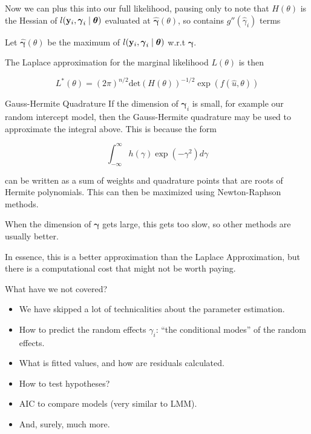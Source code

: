 \documentclass[
  ignorenonframetext,
]{beamer}
\providecommand{\tightlist}{%
  \setlength{\itemsep}{0pt}\setlength{\parskip}{0pt}}
\begin{document}
\begin{frame}
Now we can plus this into our full likelihood, pausing only to note that
\(H(\theta)\) is the Hessian of
\(l({\bf y}_i, \boldsymbol{\gamma}_i \mid {\boldsymbol \theta})\)
evaluated at \(\hat{\boldsymbol{\gamma}}(\theta)\), so contains
\(g''(\hat{\gamma}_i)\) terms

Let \(\hat{\boldsymbol{\gamma}}(\theta)\) be the maximum of
\(l({\bf y}_i, \boldsymbol{\gamma}_i \mid {\boldsymbol \theta})\) w.r.t
\(\boldsymbol{\gamma}\).

The Laplace approximation for the marginal likelihood \(L(\theta)\) is
then

\[
L^{*}(\theta)=(2\pi)^{n/2} \text{det}(H(\theta))^{-1/2} \exp(f(\hat{u},\theta))
\]
\end{frame}

\begin{frame}
\begin{block}{Gauss-Hermite Quadrature}
\protect{}\label{gauss-hermite-quadrature}
If the dimension of \({\boldsymbol \gamma}_i\) is small, for example our
random intercept model, then the Gauss-Hermite quadrature may be used to
approximate the integral above. This is because the form

\[\int_{-\infty}^{\infty} h(\gamma)\exp(-\gamma^2)d\gamma\]

can be written as a sum of weights and quadrature points that are roots
of Hermite polynomials. This can then be maximized using Newton-Raphson
methods.

When the dimension of \({\boldsymbol \gamma}\) gets large, this gets too
slow, so other methods are usually better.

In essence, this is a better approximation than the Laplace
Approximation, but there is a computational cost that might not be worth
paying.
\end{block}
\end{frame}

\begin{frame}{What have we not covered?}
\protect{}\label{what-have-we-not-covered}
\begin{itemize}
\tightlist
\item
  We have skipped a lot of technicalities about the parameter
  estimation.
\item
  How to predict the random effects \(\gamma_i\): ``the conditional
  modes'' of the random effects.
\item
  What is fitted values, and how are residuals calculated.
\item
  How to test hypotheses?
\item
  AIC to compare models (very similar to LMM).
\item
  And, surely, much more.
\end{itemize}
\end{frame}
\end{document}
